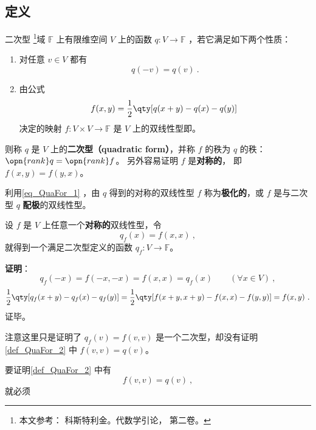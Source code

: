 
\subsection{定义}
\begin{definition}{二次型}\label{def_QuaFor_2}
\footnote{本文参考： 科斯特利金。代数学引论， 第二卷。}域 $\mathbb{F}$ 上有限维空间 $V$ 上的函数 $q:V\rightarrow\mathbb{F}$ ，若它满足如下两个性质：
\begin{enumerate}
\item 对任意 $v\in V$ 都有
\begin{equation}
q(-{v})=q(v)~.
\end{equation}
\item 由公式
\begin{equation}\label{eq_QuaFor_1}
f(x, y)=\frac{1}{2}\qty[q(x+ y)-q(x)-q(y)]~
\end{equation}
决定的映射 $f:V\times V\rightarrow\mathbb{F}$ 是 $V$ 上的双线性型即。
\end{enumerate}
则称 $q$ 是 $V$ 上的\textbf{二次型（quadratic form）}，并称 $f$ 的秩为 $q$ 的秩：$\opn{rank} q = \opn{rank} f$。 另外容易证明 $f$ 是\textbf{对称的}， 即 $f(x,y) = f(y,x)$。
\end{definition}
利用\autoref{eq_QuaFor_1} ，由 $q$ 得到的对称的双线性型 $f$ 称为\textbf{极化的}，或 $f$ 是与二次型 $q$ \textbf{配极}的双线性型。
\begin{example}{}
设 $f$ 是 $V$ 上任意一个\textbf{对称的}双线性型，令
\begin{equation}
q_f( x)=f( x, x)~,
\end{equation}
就得到一个满足二次型定义的函数 $q_f:V\rightarrow\mathbb{F}$。

\textbf{证明}：
\begin{equation}
q_f(-{x})=f(-{x},-{x})=f({x},{x})=q_f({x}) \qquad (\forall x\in V)~,
\end{equation}
\begin{equation}
\frac{1}{2}\qty[q_f(x+ y)-q_f(x)-q_f(y)] = \frac{1}{2}\qty[f( x+ y, x+ y)-f( x, x)-f( y, y)] = f(x, y)~.
\end{equation}
证毕。

注意这里只是证明了 $q_f(v) = f(v,v)$ 是一个二次型，却没有证明\autoref{def_QuaFor_2} 中 $f(v,v) = q(v)$。
\end{example}

要证明\autoref{def_QuaFor_2} 中有
\begin{equation}
f(v, v) = q(v)~,
\end{equation}
就必须

